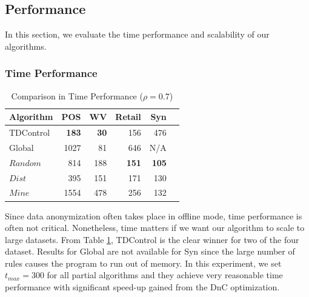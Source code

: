 \subsection{Performance}\label{sec:eval:performance}
In this section, we evaluate the time performance and scalability of
our algorithms.

\subsubsection{Time Performance}\label{sec:eval:time}
\begin{table}[th]
\caption{Comparison in Time Performance ($\rho=0.7$)}
\centering
\begin{tabular}{|l|r|r|r|r|r|}
  \hline
  Algorithm & POS & WV & Retail  &Syn \\  \hline \hline
  TDControl & \bf{183} & \bf{30 }& 156 &   476  \\  \hline
  Global & 1027 & 81 & 646 &   N/A  \\  \hline
  $Random$ & 814 & 188 & \bf{151} & \bf{105} \\\hline
  $Dist$ & 395 & 151 & 171 & 130\\ \hline
  $Mine$ & 1554 & 478& 256 & 132\\ \hline
  \end{tabular}
\label{tab:timeresult}
\end{table}

Since data anonymization often takes place in offline mode,
time performance is often not critical.
Nonetheless, time matters if we want our algorithm to
scale to large datasets.
From Table \ref{tab:timeresult}, TDControl is the clear winner
for two of the four dataset.
Results for Global are not available for Syn since
the large number of rules causes the program to run out of memory.
In this experiment, we set $t_{max} = 300$ for all partial algorithms  and they achieve
very reasonable time performance with significant speed-up gained from the DnC
optimization.
%

